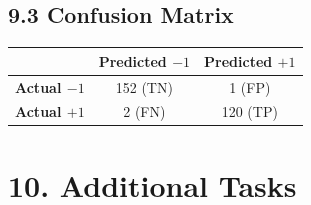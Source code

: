 \documentclass[11pt]{article}
\begin{document}
\subsection*{9.3 Confusion Matrix}

\begin{center}
\begin{tabular}{|c|c|c|}
\hline
 & \textbf{Predicted $-1$} & \textbf{Predicted $+1$}\\
\hline
\textbf{Actual $-1$} & 152 (TN) & 1 (FP)\\
\hline
\textbf{Actual $+1$} & 2 (FN) & 120 (TP)\\
\hline
\end{tabular}
\end{center}


\section*{10. Additional Tasks}
\end{document}

